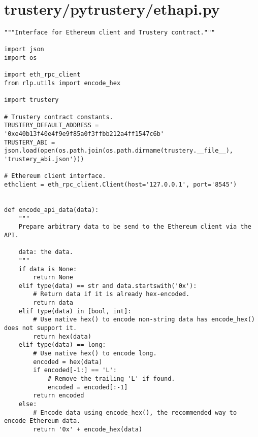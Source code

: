 \documentclass[12pt]{report}
\begin{document}
	\section{trustery/pytrustery/ethapi.py}
	\begin{lstlisting}
"""Interface for Ethereum client and Trustery contract."""

import json
import os

import eth_rpc_client
from rlp.utils import encode_hex

import trustery

# Trustery contract constants.
TRUSTERY_DEFAULT_ADDRESS = '0xe40b13f40e4f9e9f85a0f3ffbb212a4ff1547c6b'
TRUSTERY_ABI = json.load(open(os.path.join(os.path.dirname(trustery.__file__), 'trustery_abi.json')))

# Ethereum client interface.
ethclient = eth_rpc_client.Client(host='127.0.0.1', port='8545')


def encode_api_data(data):
    """
    Prepare arbitrary data to be send to the Ethereum client via the API.

    data: the data.
    """
    if data is None:
        return None
    elif type(data) == str and data.startswith('0x'):
        # Return data if it is already hex-encoded.
        return data
    elif type(data) in [bool, int]:
        # Use native hex() to encode non-string data has encode_hex() does not support it.
        return hex(data)
    elif type(data) == long:
        # Use native hex() to encode long.
        encoded = hex(data)
        if encoded[-1:] == 'L':
            # Remove the trailing 'L' if found.
            encoded = encoded[:-1]
        return encoded
    else:
        # Encode data using encode_hex(), the recommended way to encode Ethereum data.
        return '0x' + encode_hex(data)
	\end{lstlisting}
	
\end{document}
